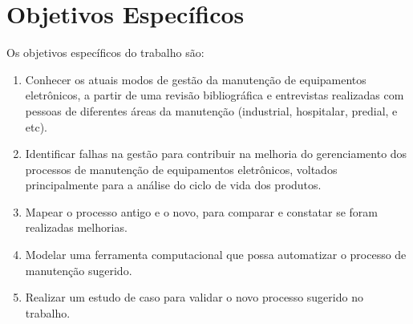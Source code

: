 
\section{Objetivos Específicos}

Os objetivos específicos do trabalho são:

\begin{enumerate}
	\item Conhecer os atuais modos de gestão da manutenção de equipamentos eletrônicos, a partir de uma revisão bibliográfica e entrevistas realizadas com pessoas de diferentes áreas da manutenção (industrial, hospitalar, predial, e etc).
	\item Identificar falhas na gestão para contribuir na melhoria do gerenciamento dos processos de manutenção de equipamentos eletrônicos, voltados principalmente para a análise do ciclo de vida dos produtos.
	\item Mapear o processo antigo e o novo, para comparar e constatar se foram realizadas melhorias.
	\item Modelar uma ferramenta computacional que possa automatizar o processo de manutenção sugerido.
	\item Realizar um estudo de caso para validar o novo processo sugerido no trabalho.
\end{enumerate}

%







